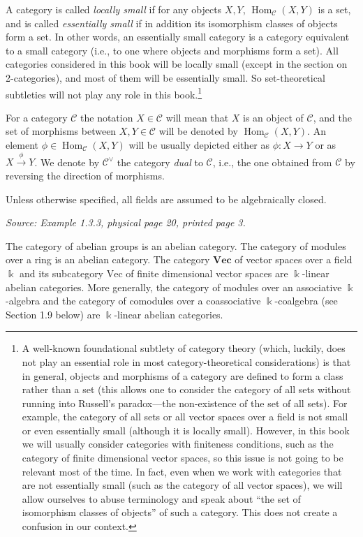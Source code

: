 \documentclass[11pt]{article}
\newcommand{\kk}{\Bbbk}
\newcommand{\cC}{\mathcal{C}}
\newcommand{\FiniteVec}{\mathrm{Vec}}
\newcommand{\AllVec}{\mathbf{Vec}}
\newcommand{\Hom}{\operatorname{Hom}}
\newcommand{\sourceloc}[1]{\par\smallskip\noindent\textit{Source: #1.}\par\smallskip}
\begin{document}
A category is called \emph{locally small} if for any objects $X,Y$,
$\Hom_{\cC}(X,Y)$ is a set, and is called \emph{essentially small} if in
addition its isomorphism classes of objects form a set. In other words,
an essentially small category is a category equivalent to a small category
(i.e., to one where objects and morphisms form a set). All categories
considered in this book will be locally small (except in the section on
2-categories), and most of them will be essentially small. So set-theoretical
subtleties will not play any role in this book.\footnote[1]{A well-known
foundational subtlety of category theory (which, luckily, does not play an
essential role in most category-theoretical considerations) is that in
general, objects and morphisms of a category are defined to form a class
rather than a set (this allows one to consider the category of all sets
without running into Russell's paradox---the non-existence of the set of
all sets). For example, the category of all sets or all vector spaces over
a field is not small or even essentially small (although it is locally
small). However, in this book we will usually consider categories with
finiteness conditions, such as the category of finite dimensional vector
spaces, so this issue is not going to be relevant most of the time. In fact,
even when we work with categories that are not essentially small (such as
the category of all vector spaces), we will allow ourselves to abuse
terminology and speak about ``the set of isomorphism classes of objects''
of such a category. This does not create a confusion in our context.}

For a category $\cC$ the notation $X\in\cC$ will mean that $X$ is an object
of $\cC$, and the set of morphisms between $X,Y\in\cC$ will be denoted by
$\Hom_{\cC}(X,Y)$. An element $\phi\in\Hom_{\cC}(X,Y)$ will be usually
depicted either as $\phi:X\to Y$ or as $X\xrightarrow{\phi}Y$.
We denote by $\cC^{\vee}$ the category \emph{dual} to $\cC$, i.e., the one
obtained from $\cC$ by reversing the direction of morphisms.

Unless otherwise specified, all fields are assumed to be algebraically closed.

\sourceloc{Example 1.3.3, physical page 20, printed page 3}
The category of abelian groups is an abelian category. The category of modules
over a ring is an abelian category. The category $\AllVec$ of vector spaces
over a field $\kk$ and its subcategory $\FiniteVec$ of finite dimensional vector
spaces are $\kk$-linear abelian categories. More generally, the category of
modules over an associative $\kk$-algebra and the category of comodules over
a coassociative $\kk$-coalgebra (see Section 1.9 below) are $\kk$-linear
abelian categories.
\end{document}

